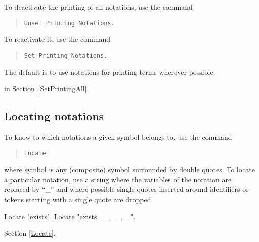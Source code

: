 To deactivate the printing of all notations, use the command
\begin{quote}
\tt Unset Printing Notations.
\end{quote}
To reactivate it, use the command
\begin{quote}
\tt Set Printing Notations.
\end{quote}
The default is to use notations for printing terms wherever possible.

 in Section~\ref{SetPrintingAll}.

\subsection{Locating notations
\label{LocateSymbol}}

To know to which notations a given symbol belongs to, use the command
\begin{quote}
\tt Locate {\symbolentry}
\end{quote}
where symbol is any (composite) symbol surrounded by double quotes. To locate
a particular notation, use a string where the variables of the
notation are replaced by ``\_'' and where possible single quotes
inserted around identifiers or tokens starting with a single quote are
dropped.

\Example
\begin{coq_example}
Locate "exists".
Locate "exists _ .. _ , _".
\end{coq_example}

\SeeAlso Section \ref{Locate}.

